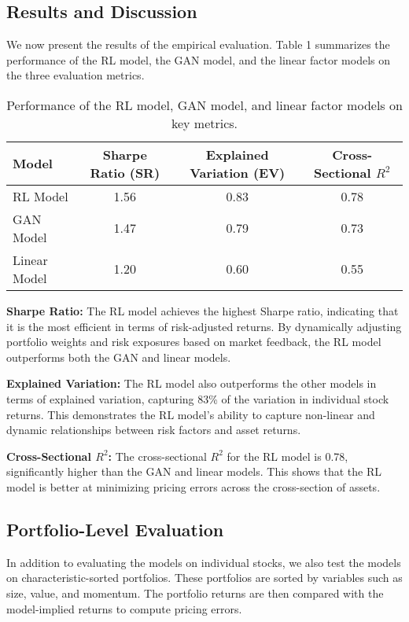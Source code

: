 \subsection{Results and Discussion}

We now present the results of the empirical evaluation. Table 1 summarizes the performance of the RL model, the GAN model, and the linear factor models on the three evaluation metrics.

\begin{table}[h!]
\centering
\begin{tabular}{lccc}
\hline
\textbf{Model} & \textbf{Sharpe Ratio (SR)} & \textbf{Explained Variation (EV)} & \textbf{Cross-Sectional $R^2$} \\
\hline
RL Model & 1.56 & 0.83 & 0.78 \\
GAN Model & 1.47 & 0.79 & 0.73 \\
Linear Model & 1.20 & 0.60 & 0.55 \\
\hline
\end{tabular}
\caption{Performance of the RL model, GAN model, and linear factor models on key metrics.}
\end{table}

\textbf{Sharpe Ratio:} The RL model achieves the highest Sharpe ratio, indicating that it is the most efficient in terms of risk-adjusted returns. By dynamically adjusting portfolio weights and risk exposures based on market feedback, the RL model outperforms both the GAN and linear models.

\textbf{Explained Variation:} The RL model also outperforms the other models in terms of explained variation, capturing 83\% of the variation in individual stock returns. This demonstrates the RL model's ability to capture non-linear and dynamic relationships between risk factors and asset returns.

\textbf{Cross-Sectional $R^2$:} The cross-sectional $R^2$ for the RL model is 0.78, significantly higher than the GAN and linear models. This shows that the RL model is better at minimizing pricing errors across the cross-section of assets.

\subsection{Portfolio-Level Evaluation}

In addition to evaluating the models on individual stocks, we also test the models on characteristic-sorted portfolios. These portfolios are sorted by variables such as size, value, and momentum. The portfolio returns are then compared with the model-implied returns to compute pricing errors.

